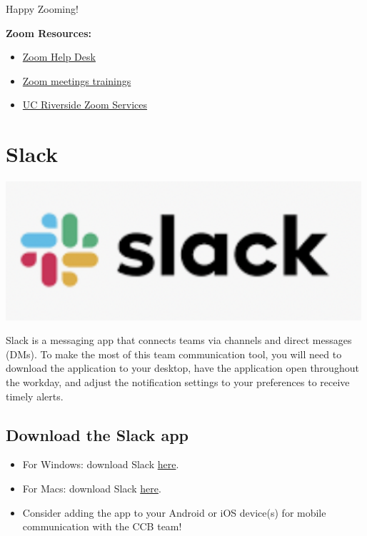 \documentclass[
]{book}
\providecommand{\tightlist}{%
  \setlength{\itemsep}{0pt}\setlength{\parskip}{0pt}}
\begin{document}
Happy Zooming!

\textbf{Zoom Resources:}

\begin{itemize}
\tightlist
\item
  \href{https://support.zoom.us/hc/en-us}{Zoom Help Desk}
\item
  \href{https://livetraining.zoom.us/rec/play/6Zx8f-j7qDw3GNeQswSDAPJ-W9S4J6qshiYfqfcNyk20WyIHNFChb7pHZuClKrDVR76R1BxgtMF4txaS?continueMode=true}{Zoom meetings trainings}
\item
  \href{https://ucr.zoom.us/}{UC Riverside Zoom Services}
\end{itemize}

\hypertarget{slack}{%
\section{Slack}\label{slack}}

\begin{flushleft}\includegraphics[width=5.19in]{images/slack} \end{flushleft}

Slack is a messaging app that connects teams via channels and direct messages (DMs). To make the most of this team communication tool, you will need to download the application to your desktop, have the application open throughout the workday, and adjust the notification settings to your preferences to receive timely alerts.

\hypertarget{download-the-slack-app}{%
\subsection{Download the Slack app}\label{download-the-slack-app}}

\begin{itemize}
\tightlist
\item
  For Windows: download Slack \href{https://slack.com/downloads/windows}{here}.
\item
  For Macs: download Slack \href{https://slack.com/downloads/mac}{here}.
\item
  Consider adding the app to your Android or iOS device(s) for mobile communication with the CCB team!
\end{itemize}
\end{document}
